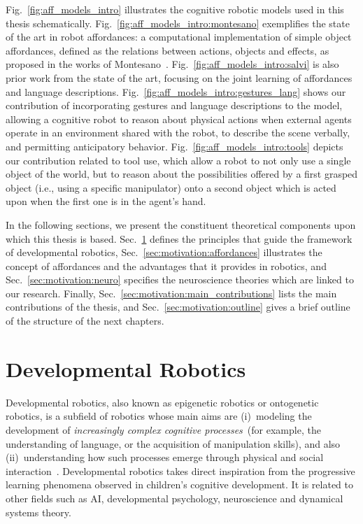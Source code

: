 Fig.~\ref{fig:aff_models_intro} illustrates the cognitive robotic models used in this thesis schematically.
Fig.~\ref{fig:aff_models_intro:montesano} exemplifies the state of the art in robot affordances: a computational implementation of simple object affordances, defined as the relations between actions, objects and effects, as proposed in the works of Montesano~\cite{montesano:2008}.
Fig.~\ref{fig:aff_models_intro:salvi} is also prior work from the state of the art, focusing on the joint learning of affordances and language descriptions.
Fig.~\ref{fig:aff_models_intro:gestures_lang} shows our contribution of incorporating gestures and language descriptions to the model, allowing a cognitive robot to reason about physical actions when external agents operate in an environment shared with the robot, to describe the scene verbally, and permitting anticipatory behavior.
Fig.~\ref{fig:aff_models_intro:tools} depicts our contribution related to tool use, which allow a robot to not only use a single object of the world, but to reason about the possibilities offered by a first grasped object (i.e., using a specific manipulator) onto a second object which is acted upon when the first one is in the agent's hand.

\bigskip

In the following sections, we present the constituent theoretical components upon which this thesis is based.
Sec.~\ref{sec:motivation:devrob} defines the principles that guide the framework of developmental robotics,
Sec.~\ref{sec:motivation:affordances} illustrates the concept of affordances and the advantages that it provides in robotics, and
Sec.~\ref{sec:motivation:neuro} specifies the neuroscience theories which are linked to our research.
Finally, Sec.~\ref{sec:motivation:main_contributions} lists the main contributions of the thesis, and Sec.~\ref{sec:motivation:outline} gives a brief outline of the structure of the next chapters.

\section{Developmental Robotics}
\label{sec:motivation:devrob}

Developmental robotics, also known as epigenetic robotics or ontogenetic robotics, is a subfield of robotics whose main aims are (i)~modeling the development of \emph{increasingly complex cognitive processes}~(for example, the understanding of language, or the acquisition of manipulation skills), and also (ii)~understanding how such processes emerge through physical and social interaction~\cite{lungarella:2003:devrobsurvey,cangelosi:2015:devrobbook}.
Developmental robotics takes direct inspiration from the progressive learning phenomena observed in children's cognitive development.
It is related to other fields such as \ac{AI}, developmental psychology, neuroscience and dynamical systems theory.

